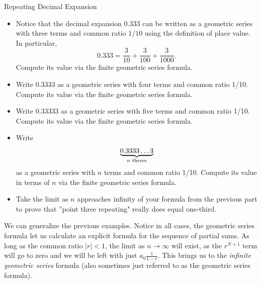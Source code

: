 \begin{exercise}{Repeating Decimal Expansion \Coffeecup \Coffeecup }\label{ThreeBar}

\begin{itemize}
\item Notice that the decimal expansion 0.333 can be written as a geometric series with three terms and common ratio $1/10$ using the definition of place value.  In particular, $$ 0.333=\frac{3}{10}+\frac{3}{100}+\frac{3}{1000}.$$ Compute its value via the finite geometric series formula.

\vspace*{1in}

\item Write 0.3333 as a geometric series with four terms and common ratio 1/10.  Compute its value via the finite geometric series formula.

\vspace*{1in}

\item Write 0.33333 as a geometric series with five terms and common ratio 1/10.  Compute its value via the finite geometric series formula.

\vspace*{1in}

\item Write $$ \underbrace{0.3333 \ldots 3}_{n \textup{ threes}} $$ as a geometric series with $n$ terms and common ratio 1/10.  Compute its value in terms of $n$ via the finite geometric series formula.

\vspace*{1in}

\item Take the limit as $n$ approaches infinity of your formula from the previous part to prove that ''point three repeating" really does equal one-third.

\vspace*{1in}
\end{itemize}
\end{exercise}

We can generalize the previous examples.  Notice in all cases, the geometric series formula let us calculate an explicit formula for the sequence of partial sums.  As long as the common ratio $|r|<1$, the limit as $n\rightarrow \infty$ will exist, as the $r^{N+1}$ term will go to zero and we will be left with just $a_0\frac{1}{1-r}$.  This brings us to the \emph{infinite geometric series} formula (also sometimes just referred to as the geometric series formula).

